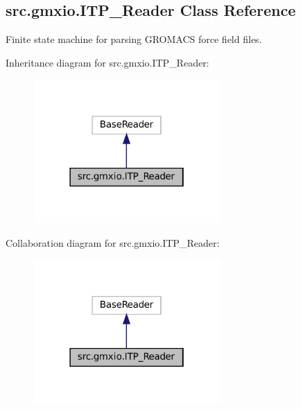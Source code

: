 \hypertarget{classsrc_1_1gmxio_1_1ITP__Reader}{}\subsection{src.\+gmxio.\+I\+T\+P\+\_\+\+Reader Class Reference}
\label{classsrc_1_1gmxio_1_1ITP__Reader}


Finite state machine for parsing G\+R\+O\+M\+A\+CS force field files.  




Inheritance diagram for src.\+gmxio.\+I\+T\+P\+\_\+\+Reader\+:
\nopagebreak
\begin{figure}[H]
\begin{center}
\leavevmode
\includegraphics[width=202pt]{classsrc_1_1gmxio_1_1ITP__Reader__inherit__graph}
\end{center}
\end{figure}


Collaboration diagram for src.\+gmxio.\+I\+T\+P\+\_\+\+Reader\+:
\nopagebreak
\begin{figure}[H]
\begin{center}
\leavevmode
\includegraphics[width=202pt]{classsrc_1_1gmxio_1_1ITP__Reader__coll__graph}
\end{center}
\end{figure}
